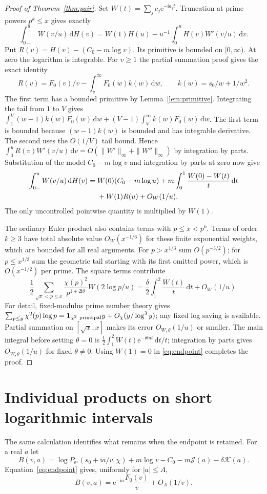 \documentclass[11pt]{article}
\newcommand{\dd}{\,\mathrm d}
\newcommand{\e}{\mathrm e}
\newcommand{\ii}{\mathrm i}
\newcommand{\J}{\mathcal J}
\newcommand{\K}{\mathcal K}
\begin{document}
\begin{proof}[Proof of Theorem~\ref{thm:pair}]
Set $W(t)=\sum_j c_j\e^{-\ii a_jt}$. Truncation at prime powers $p^k\le x$ gives exactly
\[
 \int_{0-}^u W(v/u)\dd H(v)
 = W(1)H(u)-u^{-1}\int_0^u H(v)W'(v/u)\dd v .
\]
Put $R(v)=H(v)-(C_0-m\log v)$. Its primitive is bounded on $[0,\infty)$. At zero the logarithm is integrable. For $v\ge1$ the partial summation proof gives the exact identity
\[
 R(v)=F_0(v)/v-\int_v^\infty F_0(w)k(w)\dd w,\qquad k(w)=s_0/w+1/w^2.
\]
The first term has a bounded primitive by Lemma~\ref{lem:primitive}. Integrating the tail from $1$ to $V$ gives
$\int_1^V(w-1)k(w)F_0(w)\dd w+(V-1)\int_V^\infty k(w)F_0(w)\dd w$.
The first term is bounded because $(w-1)k(w)$ is bounded and has integrable derivative. The second uses the $O(1/V)$ tail bound. Hence
$\int_0^u R(v)W'(v/u)\dd v=O(\|W'\|_\infty+\|W''\|_\infty)$
by integration by parts. Substitution of the model $C_0-m\log v$ and integration by parts at zero now give
\begin{align}
 \int_{0-}^u W(v/u)\dd H(v)={}& W(0)(C_0-m\log u)
       +m\int_0^1\frac{W(0)-W(t)}{t}\dd t\notag\\
       &+W(1)R(u)+O_W(1/u). \label{eq:endpoint}
\end{align}
The only uncontrolled pointwise quantity is multiplied by $W(1)$.

The ordinary Euler product also contains terms with $p\le x<p^k$. Terms of order $k\ge3$ have total absolute value $O_W(x^{-1/6})$ for these finite exponential weights, which are bounded for all real arguments. For $p>x^{1/3}$ sum $O(p^{-3/2})$; for $p\le x^{1/3}$ sum the geometric tail starting with its first omitted power, which is $O(x^{-1/2})$ per prime. The square terms contribute
\[
 \frac12\sum_{\sqrt{x}<p\le x}\frac{\chi(p)^2}{p^{1+2\ii\theta}}
                        W(2\log p/u)
 = \frac{\delta}{2}\int_1^2\frac{W(t)}t\dd t+O_W(1/u).
\]
For detail, fixed-modulus prime number theory gives
$\sum_{p\le y}\chi^2(p)\log p=\mathbf1_{\chi^2\ {\rm principal}}y+O_\chi(y/\log^3 y)$; any fixed log saving is available. Partial summation on $[\sqrt x,x]$ makes its error $O_{W,\theta}(1/u)$ or smaller. The main integral before setting $\theta=0$ is $\tfrac12\int_1^2 W(t)\e^{-\ii\theta u t}\dd t/t$; integration by parts gives $O_{W,\theta}(1/u)$ for fixed $\theta\ne0$. Using $W(1)=0$ in \eqref{eq:endpoint} completes the proof.
\end{proof}

\section{Individual products on short logarithmic intervals}
The same calculation identifies what remains when the endpoint is retained.
For a real $a$ let
\[
 B(v,a)=\log P_{\e^v}(s_0+\ii a/v,\chi)+m\log v
          -C_0-m\J(a)-\delta\K(a).
\]
Equation~\eqref{eq:endpoint} gives, uniformly for $|a|\le A$,
\begin{equation}\label{eq:single}
 B(v,a)=\e^{-\ii a}\frac{F_0(v)}{v}
             +O_A(1/v).
\end{equation}
\end{document}
